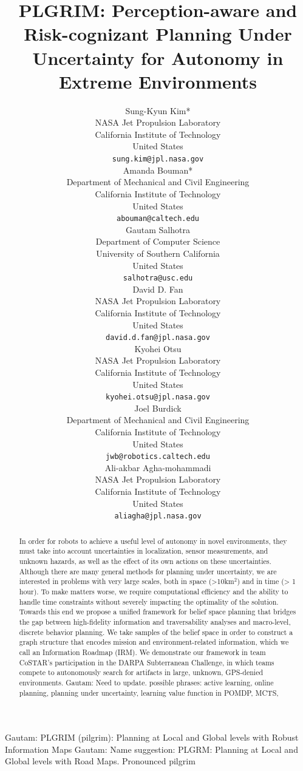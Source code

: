 \documentclass{article}
\title{
PLGRIM: 
Perception-aware and Risk-cognizant Planning Under Uncertainty for Autonomy in Extreme Environments
}
\author{
  Sung-Kyun Kim*\\
  NASA Jet Propulsion Laboratory\\
  California Institute of Technology\\
  United States\\
  \texttt{sung.kim@jpl.nasa.gov} \\
  \And
  Amanda Bouman*\\
  Department of Mechanical and Civil Engineering\\
  California Institute of Technology\\
  United States\\
  \texttt{abouman@caltech.edu} \\
  \And
  Gautam Salhotra\\
  Department of Computer Science\\
  University of Southern California\\
  United States\\
  \texttt{salhotra@usc.edu} \\
  \And
  David D. Fan\\
  NASA Jet Propulsion Laboratory\\
  California Institute of Technology\\
  United States\\
  \texttt{david.d.fan@jpl.nasa.gov} \\
  \And
  Kyohei Otsu\\
  NASA Jet Propulsion Laboratory\\
  California Institute of Technology\\
  United States\\
  \texttt{kyohei.otsu@jpl.nasa.gov} \\
  \And
  Joel Burdick\\
  Department of Mechanical and Civil Engineering\\
  California Institute of Technology\\
  United States\\
  \texttt{jwb@robotics.caltech.edu} \\
  \And
  Ali-akbar Agha-mohammadi\\
  NASA Jet Propulsion Laboratory\\
  California Institute of Technology\\
  United States\\
  \texttt{aliagha@jpl.nasa.gov} \\
}
\newcommand{\ph}[1]{{\textbf{#1}:}} %
\newcommand{\gautam}[1]{{\color{cyan}Gautam: #1 }}
\begin{document}
\maketitle


\begin{abstract}
In order for robots to achieve a useful level of autonomy in novel environments, they must take into account uncertainties in localization, sensor measurements, and unknown hazards, as well as the effect of its own actions on these uncertainties.  Although there are many general methods for planning under uncertainty, we are interested in problems with very large scales, both in space (>10km$^2$) and in time (> 1 hour).  To make matters worse, we require computational efficiency and the ability to handle time constraints without severely impacting the optimality of the solution.  Towards this end we propose a unified framework for belief space planning that bridges the gap between high-fidelity information and traversability analyses and macro-level, discrete behavior planning.  We take samples of the belief space in order to construct a graph structure that encodes mission and environment-related information, which we call an Information Roadmap (IRM).  We demonstrate our framework in team CoSTAR's participation in the DARPA Subterranean Challenge, in which teams compete to autonomously search for artifacts in large, unknown, GPS-denied environments.
\gautam{Need to update. possible phrases: active learning, online planning, planning under uncertainty, learning value function in POMDP, MCTS, }
\end{abstract}

\gautam{PLGRIM (pilgrim): Planning at Local and Global levels with Robust Information Maps}
\gautam{Name suggestion: PLGRM: Planning at Local and Global levels with Road Maps. Pronounced pilgrim}




\end{document}
